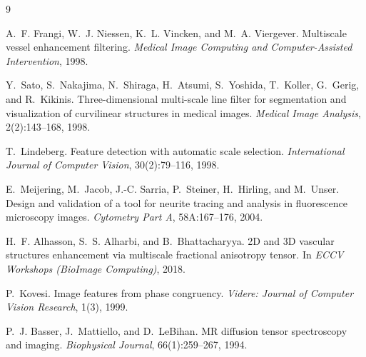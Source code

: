 \documentclass[a4paper,justified]{tufte-book}
\begin{document}
\begin{thebibliography}{9}

A.~F. Frangi, W.~J. Niessen, K.~L. Vincken, and M.~A. Viergever.
\newblock Multiscale vessel enhancement filtering.
\newblock \emph{Medical Image Computing and Computer-Assisted Intervention},
1998.

Y.~Sato, S.~Nakajima, N.~Shiraga, H.~Atsumi, S.~Yoshida, T.~Koller,
G.~Gerig, and R.~Kikinis.
\newblock Three-dimensional multi-scale line filter for segmentation and
visualization of curvilinear structures in medical images.
\newblock \emph{Medical Image Analysis}, 2(2):143--168, 1998.

T.~Lindeberg.
\newblock Feature detection with automatic scale selection.
\newblock \emph{International Journal of Computer Vision}, 30(2):79--116, 1998.

E.~Meijering, M.~Jacob, J.-C. Sarria, P.~Steiner, H.~Hirling, and M.~Unser.
\newblock Design and validation of a tool for neurite tracing and analysis in
fluorescence microscopy images.
\newblock \emph{Cytometry Part A}, 58A:167--176, 2004.

H.~F. Alhasson, S.~S. Alharbi, and B.~Bhattacharyya.
\newblock 2D and 3D vascular structures enhancement via multiscale fractional
anisotropy tensor.
\newblock In \emph{ECCV Workshops (BioImage Computing)}, 2018.

P.~Kovesi.
\newblock Image features from phase congruency.
\newblock \emph{Videre: Journal of Computer Vision Research}, 1(3), 1999.

P.~J. Basser, J.~Mattiello, and D.~LeBihan.
\newblock MR diffusion tensor spectroscopy and imaging.
\newblock \emph{Biophysical Journal}, 66(1):259--267, 1994.

\end{thebibliography}
\end{document}
